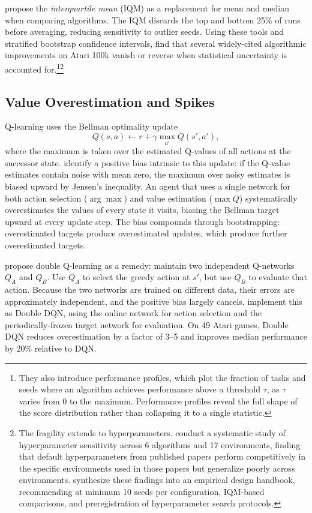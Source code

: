 \citet{Agarwal2021} propose the \emph{interquartile mean} (IQM) as a replacement for mean and median when comparing algorithms. The IQM discards the top and bottom 25\% of runs before averaging, reducing sensitivity to outlier seeds. Using these tools and stratified bootstrap confidence intervals, \citet{Agarwal2021} find that several widely-cited algorithmic improvements on Atari 100k vanish or reverse when statistical uncertainty is accounted for.\footnote{They also introduce performance profiles, which plot the fraction of tasks and seeds where an algorithm achieves performance above a threshold $\tau$, as $\tau$ varies from 0 to the maximum. Performance profiles reveal the full shape of the score distribution rather than collapsing it to a single statistic.}\footnote{The fragility extends to hyperparameters. \citet{Eimer2023} conduct a systematic study of hyperparameter sensitivity across 6 algorithms and 17 environments, finding that default hyperparameters from published papers perform competitively in the specific environments used in those papers but generalize poorly across environments. \citet{Patterson2024} synthesize these findings into an empirical design handbook, recommending at minimum 10 seeds per configuration, IQM-based comparisons, and preregistration of hyperparameter search protocols.}

\subsection{Value Overestimation and Spikes}
\label{sec:overestimation}

Q-learning uses the Bellman optimality update
\begin{equation}
    Q(s,a) \leftarrow r + \gamma \max_{a'} Q(s', a'),
    \label{eq:q_update}
\end{equation}
where the maximum is taken over the estimated Q-values of all actions at the successor state. \citet{ThrunSchwartz1993} identify a positive bias intrinsic to this update: if the Q-value estimates contain noise with mean zero, the maximum over noisy estimates is biased upward by Jensen's inequality. An agent that uses a single network for both action selection ($\arg\max$) and value estimation ($\max Q$) systematically overestimates the values of every state it visits, biasing the Bellman target upward at every update step. The bias compounds through bootstrapping: overestimated targets produce overestimated updates, which produce further overestimated targets.

\citet{vanHasselt2010} propose double Q-learning as a remedy: maintain two independent Q-networks $Q_A$ and $Q_B$. Use $Q_A$ to select the greedy action at $s'$, but use $Q_B$ to evaluate that action. Because the two networks are trained on different data, their errors are approximately independent, and the positive bias largely cancels. \citet{vanHasselt2016ddqn} implement this as Double DQN, using the online network for action selection and the periodically-frozen target network for evaluation. On 49 Atari games, Double DQN reduces overestimation by a factor of 3--5 and improves median performance by 20\% relative to DQN.

